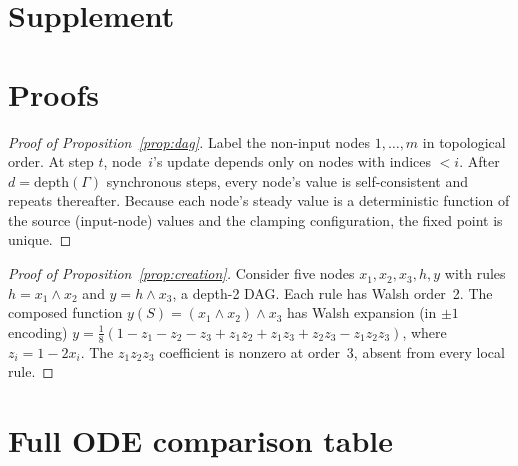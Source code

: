 \documentclass[10pt]{article}
\begin{document}





\clearpage
\appendix
\renewcommand{\thesection}{S\arabic{section}}
\setcounter{section}{0}
\section*{Supplement}


\section{Proofs}
\label{supp:proofs}

\begin{proof}[Proof of Proposition~\ref{prop:dag}]
Label the non-input nodes $1, \ldots, m$ in topological order. At
step $t$, node~$i$'s update depends only on nodes with indices
$< i$. After $d = \mathrm{depth}(\Gamma)$ synchronous steps, every
node's value is self-consistent and repeats thereafter. Because
each node's steady value is a deterministic function of the source
(input-node) values and the clamping configuration, the fixed point
is unique.
\end{proof}

\begin{proof}[Proof of Proposition~\ref{prop:creation}]
Consider five nodes $x_1, x_2, x_3, h, y$ with rules
$h = x_1 \wedge x_2$ and $y = h \wedge x_3$, a depth-2 DAG. Each
rule has Walsh order~2. The composed function
$y(S) = (x_1 \wedge x_2) \wedge x_3$ has Walsh expansion (in
$\pm 1$ encoding)
$y = \tfrac{1}{8}(1 - z_1 - z_2 - z_3 + z_1 z_2 + z_1 z_3
+ z_2 z_3 - z_1 z_2 z_3)$,
where $z_i = 1 - 2x_i$. The $z_1 z_2 z_3$ coefficient is nonzero
at order~3, absent from every local rule.
\end{proof}


\section{Full ODE comparison table}
\label{supp:ode-table}
\end{document}
